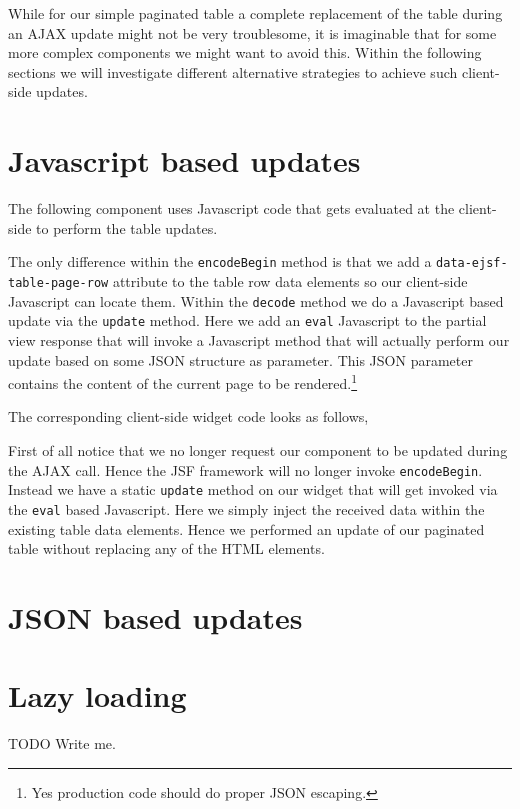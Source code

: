 While for our simple paginated table a complete replacement of the table during an AJAX update might not be very troublesome, it is imaginable that for some more complex components we might want to avoid this.
Within the following sections we will investigate different alternative strategies to achieve such client-side updates.


\section{Javascript based updates}
The following component uses Javascript code that gets evaluated at the client-side to perform the table updates.

The only difference within the \texttt{encodeBegin} method is that we add a \texttt{data-ejsf-table-\allowbreak page-row} attribute to the table row data elements so our client-side Javascript can locate them.
Within the \texttt{decode} method we do a Javascript based update via the \texttt{update} method.
Here we add an \texttt{eval} Javascript to the partial view response that will invoke a Javascript method that will actually perform our update based on some JSON structure as parameter.
This JSON parameter contains the content of the current page to be rendered.\footnote{Yes production code should do proper JSON escaping.}

The corresponding client-side widget code looks as follows,

First of all notice that we no longer request our component to be updated during the AJAX call.
Hence the JSF framework will no longer invoke \texttt{encodeBegin}.
Instead we have a static \texttt{update} method on our widget that will get invoked via the \texttt{eval} based Javascript.
Here we simply inject the received data within the existing table data elements.
Hence we performed an update of our paginated table without replacing any of the HTML elements.

\section{JSON based updates}

\section{Lazy loading}



\begin{TODO}{TODO}
	Write me.
\end{TODO}
